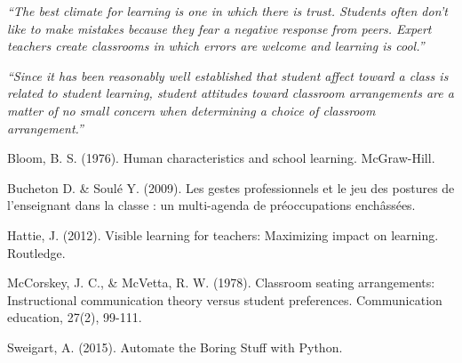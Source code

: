 \documentclass[10pt]{article}
\begin{document}
\begin{center} 
\emph{``The best climate for learning is one in which there is trust. Students often don’t like to make mistakes because they fear a negative response from peers. Expert teachers create classrooms in which errors are welcome and learning is cool.''} \cite{Hat12}
\end{center}
 
\begin{center} 
\emph{``Since it has been reasonably well established that student affect toward a class is related to student learning, student attitudes toward classroom arrangements are a matter of no small concern when determining a choice of classroom arrangement.''} \cite{MM78}
\end{center}

\begin{thebibliography}{2}

 Bloom, B. S. (1976). Human characteristics and school learning. McGraw-Hill.

 Bucheton D. \& Soulé Y. (2009). Les gestes professionnels et le jeu des postures de l’enseignant dans la classe : un multi-agenda de préoccupations enchâssées.

 Hattie, J. (2012). Visible learning for teachers: Maximizing impact on learning. Routledge.

 McCorskey, J. C., \& McVetta, R. W. (1978). Classroom seating arrangements: Instructional communication theory versus student preferences. Communication education, 27(2), 99-111.

 Sweigart, A. (2015). Automate the Boring Stuff with Python.
\end{thebibliography}
\end{document}
